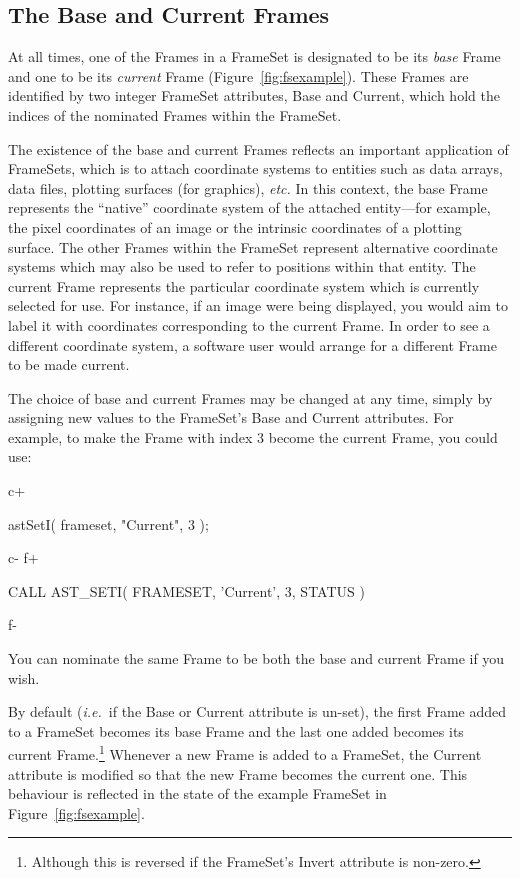 \documentclass[twoside,11pt]{starlink}
\begin{document}
{\subsection{\label{ss:baseandcurrent}The Base and Current Frames}

At all times, one of the Frames in a FrameSet is designated to be its
\emph{base} Frame and one to be its \emph{current} Frame
(Figure~\ref{fig:fsexample}). These Frames are identified by two
integer FrameSet attributes, Base and Current, which hold the indices
of the nominated Frames within the FrameSet.

The existence of the base and current Frames reflects an important
application of FrameSets, which is to attach coordinate systems to
entities such as data arrays, data files, plotting surfaces (for
graphics), \emph{etc.}  In this context, the base Frame represents the
``native'' coordinate system of the attached entity---for example, the
pixel coordinates of an image or the intrinsic coordinates of a
plotting surface. The other Frames within the FrameSet represent
alternative coordinate systems which may also be used to refer to
positions within that entity.  The current Frame represents the
particular coordinate system which is currently selected for use. For
instance, if an image were being displayed, you would aim to label it
with coordinates corresponding to the current Frame. In order to see a
different coordinate system, a software user would arrange for a
different Frame to be made current.

The choice of base and current Frames may be changed at any time,
simply by assigning new values to the FrameSet's Base and Current
attributes. For example, to make the Frame with index 3 become the
current Frame, you could use:

c+
\small
\begin{terminalv}
astSetI( frameset, "Current", 3 );
\end{terminalv}
\normalsize
c-
f+
\small
\begin{terminalv}
      CALL AST_SETI( FRAMESET, 'Current', 3, STATUS )
\end{terminalv}
\normalsize
f-

You can nominate the same Frame to be both the base and current Frame
if you wish.
\label{ss:baseandcurrentdefault}

By default (\emph{i.e.}\ if the Base or Current attribute is un-set),
the first Frame added to a FrameSet becomes its base Frame and the
last one added becomes its current Frame.\footnote{Although this is
reversed if the FrameSet's Invert attribute is non-zero.} Whenever a
new Frame is added to a FrameSet, the Current attribute is modified so
that the new Frame becomes the current one. This behaviour is
reflected in the state of the example FrameSet in
Figure~\ref{fig:fsexample}.

}
\end{document}
